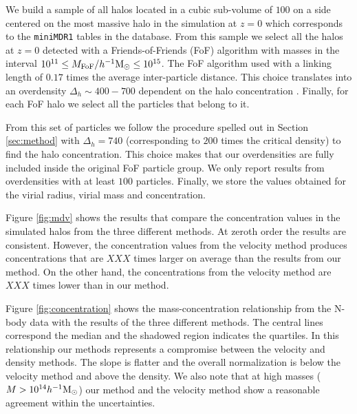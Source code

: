 \documentclass{emulateapj}
\newcommand{\hMpc}{{\ifmmode{h^{-1}{\rm Mpc}}\else{$h^{-1}$Mpc }\fi}}
\newcommand{\hMsun}{{\ifmmode{h^{-1}{\rm
        {M_{\odot}}}}\else{$h^{-1}{\rm{M_{\odot}}}$}\fi}}
\begin{document}
We build a sample of all halos located in a cubic sub-volume of $100$
\hMpc on a side centered on the most massive halo in the simulation at
$z=0$ which corresponds to the \texttt{miniMDR1} tables in the
database.
From this sample we select all the halos at $z=0$ detected with a
Friends-of-Friends (FoF) algorithm with masses in the interval
$10^{11}\leq M_{\rm FoF}/\hMsun \leq 10^{15}$.
The FoF algorithm used with a linking length of $0.17$ times the average
inter-particle distance. This choice translates into an overdensity
$\Delta_h\sim 400-700$ dependent on the halo concentration
\citep{More2011}.
Finally, for each FoF halo we select all the particles that
belong to it.

From this set of particles we follow the procedure spelled out in
Section \ref{sec:method} with $\Delta_h=740$  (corresponding to $200$
times the critical density) to find the halo concentration.
This choice makes that our overdensities are fully included inside the
original FoF particle group.
We only report results from overdensities with at least $100$ particles.
Finally, we store the values obtained for the virial radius, virial
mass and concentration.

Figure \ref{fig:mdv} shows the results that compare the concentration
values in the simulated halos from the three different methods.
At zeroth order the results are consistent.
However, the concentration values from the velocity method produces
concentrations that are $XXX$ times larger on average than the results
from our method.
On the other hand, the concentrations from the velocity method are
$XXX$ times lower than in our method.



Figure \ref{fig:concentration} shows the mass-concentration
relationship from the N-body data with the results of the three
different methods.
The central lines correspond the median and the
shadowed region indicates the quartiles.
In this relationship our methods represents a compromise between the
velocity and density methods.
The slope is flatter and the overall normalization is below the
velocity method and above the density.
We also note that at high masses ($M>10^{14}\hMsun$) our method
and the velocity method show a reasonable agreement within the
uncertainties.
\end{document}
